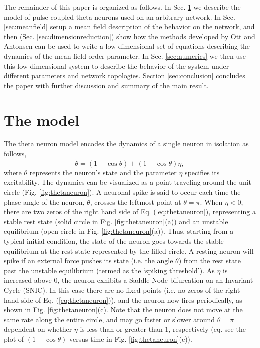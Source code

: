 \documentclass[%
 aip,
 sd,%
 amsmath,amssymb,
 reprint,%
]{revtex4-1}
\begin{document}
The remainder of this paper is organized as follows. In Sec. \ref{sec:model} we describe the model of pulse coupled theta neurons used on an arbitrary network. In Sec. \ref{sec:meanfield} setup a mean field description of the behavior on the network, and then (Sec. \ref{sec:dimensionreduction}) show how the methods developed by Ott and Antonsen\cite{ott2008low, ott2009long, ott2011comment} can be used to write a low dimensional set of equations describing the dynamics of the mean field order parameter. In Sec. \ref{sec:numerics} we then use this low dimensional system to describe the behavior of the system under different parameters and network topologies. Section \ref{sec:conclusion} concludes the paper with further discussion and summary of the main result.

\section{The model}\label{sec:model}

The theta neuron model encodes the dynamics of a single neuron in isolation as follows,
\begin{equation}\label{eq:thetaneuron}
\dot \theta = (1-\cos\theta) + (1+\cos\theta)\eta,
\end{equation}
where $\theta$ represents the neuron's state and the parameter $\eta$ specifies its excitability. The dynamics can be visualized as a point traveling around the unit circle (Fig. \ref{fig:thetaneuron}). A neuronal spike is said to occur each time the phase angle of the neuron, $\theta$, crosses the leftmost point at $\theta=\pi$. When $\eta <0$, there are two zeros of the right hand side of Eq. (\ref{eq:thetaneuron}), representing a stable rest state (solid circle in Fig. \ref{fig:thetaneuron}(a)) and an unstable equilibrium (open circle in Fig. \ref{fig:thetaneuron}(a)). Thus, starting from a typical initial condition, the state of the neuron goes towards the stable equilibrium at the rest state represented by the filled circle. A resting neuron will spike if an external force pushes its state (i.e. the angle $\theta$) from the rest state past the unstable equilibrium (termed as the `spiking threshold'). As $\eta$ is increased above $0$, the neuron exhibits a Saddle Node bifurcation on an Invariant Cycle (SNIC). In this case there are no fixed points (i.e. no zeros of the right hand side of Eq. (\ref{eq:thetaneuron})), and the neuron now fires periodically, as shown in Fig. \ref{fig:thetaneuron}(c). Note that the neuron does not move at the same rate along the entire circle, and may go faster or slower around $\theta=\pi$ dependent on whether $\eta$ is less than or greater than $1$, respectively (eq. see the plot of $(1-\cos\theta)$ versus time in Fig. \ref{fig:thetaneuron}(c)). 
\end{document}
